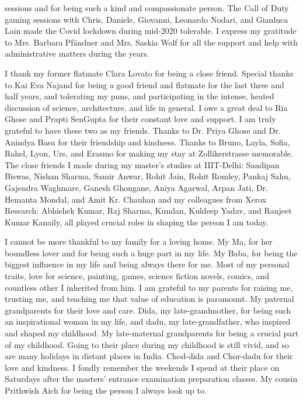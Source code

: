 sessions and for being such a kind and compassionate person. The Call of Duty gaming sessions with Chris, Daniele, Giovanni, Leonardo Nodari, and Gianluca Lain made the Covid lockdown during mid-2020 tolerable. I express my gratitude to Mrs. Barbara Pf\"andner and Mrs. Saskia Wolf for all the support and help with administrative matters during the years. 


I thank my former flatmate Clara Lovato for being a close friend. Special thanks to Kai Eva Najand for being a good friend and flatmate for the last three and half years, and tolerating my puns, and participating in the intense, heated discussion of science, architecture, and life in general. I owe a great deal to Ria Ghose and Prapti SenGupta for their constant love and support. I am truly grateful to have these two as my friends. Thanks to Dr. Priya Ghose and Dr. Anindya Basu for their friendship and kindness. Thanks to Bruno, Layla, Sofia, Rahel, Lyon, Urs, and Erasmo for making my stay at Zollikerstrasse memorable. The close friends I made during my master's studies at IIIT-Delhi: Sandipan Biswas, Nishan Sharma, Samir Anwar, Rohit Jain, Rohit Romley, Pankaj Sahu, Gajendra Waghmare, Ganesh Ghongane, Aniya Agarwal, Arpan Jati, Dr. Hemanta Mondal, and Amit Kr. Chauhan and my colleagues from Xerox Research: Abhishek Kumar, Raj Sharma, Kundan, Kuldeep Yadav, and Ranjeet Kumar Kanaily, all played crucial roles in shaping the person I am today.


I cannot be more thankful to my family for a loving home. My Ma, for her boundless lover and for being such a huge part in my life. My Baba, for being the biggest influence in my life and being always there for me. Most of my personal traits, love for science, painting, games, science fiction novels, comics, and countless other I inherited from him. I am grateful to my parents for raising me, trusting me, and teaching me that value of education is paramount. My paternal grandparents for their love and care. Dida, my late-grandmother, for being such an inspirational woman in my life, and dadu, my late-grandfather, who inspired and shaped my childhood. My late-maternal grandparents for being a crucial part of my childhood. Going to their place during my childhood is still vivid, and so are many holidays in distant places in India. Chod-dida and Chor-dadu for their love and kindness. I fondly remember the weekends I spend at their place on Saturdays after the masters' entrance examination preparation classes. My cousin Prithwish Aich for being the person I always look up to.

